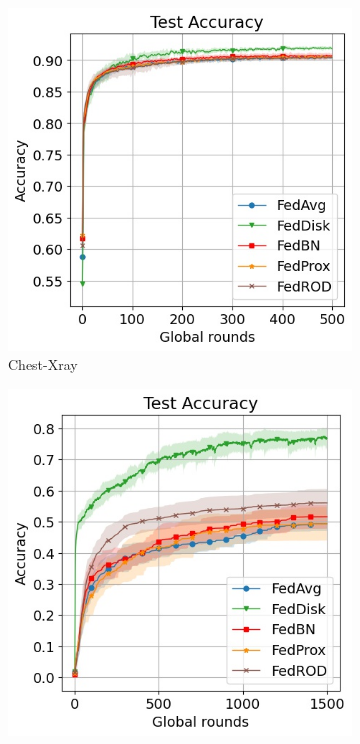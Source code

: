 \documentclass[mathfont=newtx]{uai2023} %
\begin{document}
\begin{figure}[ht!]
	\centering
	\begin{subfigure}[t]{0.3\linewidth}	
		\includegraphics[width=\linewidth]{Figures/xray/test_acc}
		\caption{Chest-Xray }
		\label{fig:acc_xray}
	\end{subfigure}
	\hspace{0.01em}%
	\begin{subfigure}[t]{0.3\linewidth}
		\includegraphics[width=\linewidth]{Figures/femnist/test_acc}

\end{subfigure}
\end{figure}
\end{document}
